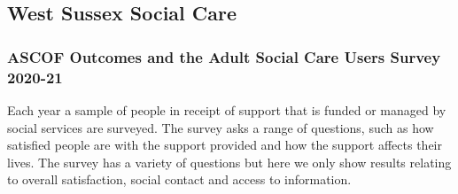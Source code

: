 \subsection{West Sussex Social Care}







\subsubsection{ASCOF Outcomes and the Adult Social Care Users Survey 2020-21}
Each year a sample of people in receipt of support that is funded or managed by social services are surveyed. The survey asks a range of questions, such as how satisfied people are with the support provided and how the support affects their lives. The survey has a variety of questions but here we only show results relating to overall satisfaction, social contact and access to information.

